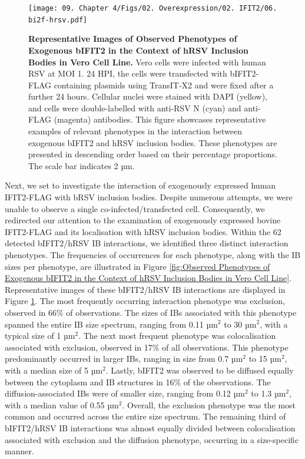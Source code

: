 \begin{figure}
    \centering
    \texttt{[image: 09. Chapter 4/Figs/02. Overexpression/02. IFIT2/06. bi2f-hrsv.pdf]}
    \caption[Representative Images of Observed Phenotypes of Exogenous bIFIT2 in the Context of hRSV Inclusion Bodies in Vero Cell Line.]{\textbf{Representative Images of Observed Phenotypes of Exogenous bIFIT2 in the Context of hRSV Inclusion Bodies in Vero Cell Line.} Vero cells were infected with human RSV at MOI 1. 24 HPI, the cells were transfected with bIFIT2-FLAG containing plasmids using TransIT-X2 and were fixed after a further 24 hours. Cellular nuclei were stained with DAPI (yellow), and cells were double-labelled with anti-RSV N (cyan) and anti-FLAG (magenta) antibodies. This figure showcases representative examples of relevant phenotypes in the interaction between exogenous bIFIT2 and hRSV inclusion bodies. These phenotypes are presented in descending order based on their percentage proportions. The scale bar indicates 2 µm.}
    \label{fig:Representative Images of Observed Phenotypes of Exogenous bIFIT2 in the Context of hRSV Inclusion Bodies in Vero Cell Line}
\end{figure}

Next, we set to investigate the interaction of exogenously expressed human IFIT2-FLAG with bRSV inclusion bodies. Despite numerous attempts, we were unable to observe a single co-infected/transfected cell. Consequently, we redirected our attention to the examination of exogenously expressed bovine IFIT2-FLAG and its localisation with hRSV inclusion bodies. Within the 62 detected bIFIT2/hRSV IB interactions, we identified three distinct interaction phenotypes. The frequencies of occurrences for each phenotype, along with the IB sizes per phenotype, are illustrated in Figure \ref{fig:Observed Phenotypes of Exogenous bIFIT2 in the Context of hRSV Inclusion Bodies in Vero Cell Line}. Representative images of these bIFIT2/hRSV IB interactions are displayed in Figure \ref{fig:Representative Images of Observed Phenotypes of Exogenous bIFIT2 in the Context of hRSV Inclusion Bodies in Vero Cell Line}. The most frequently occurring interaction phenotype was exclusion, observed in 66\% of observations. The sizes of IBs associated with this phenotype spanned the entire IB size spectrum, ranging from 0.11 \(\mbox{µm}^2\) to 30 \(\mbox{µm}^2\), with a typical size of 1 \(\mbox{µm}^2\). The next most frequent phenotype was colocalisation associated with exclusion, observed in 17\% of all observations. This phenotype predominantly occurred in larger IBs, ranging in size from 0.7 \(\mbox{µm}^2\) to 15 \(\mbox{µm}^2\), with a median size of 5 \(\mbox{µm}^2\). Lastly, bIFIT2 was observed to be diffused equally between the cytoplasm and IB structures in 16\% of the observations. The diffusion-associated IBs were of smaller size, ranging from 0.12 \(\mbox{µm}^2\) to 1.3 \(\mbox{µm}^2\), with a median value of 0.55 \(\mbox{µm}^2\). Overall, the exclusion phenotype was the most common and occurred across the entire size spectrum. The remaining third of bIFIT2/hRSV IB interactions was almost equally divided between colocalisation associated with exclusion and the diffusion phenotype, occurring in a size-specific manner.

